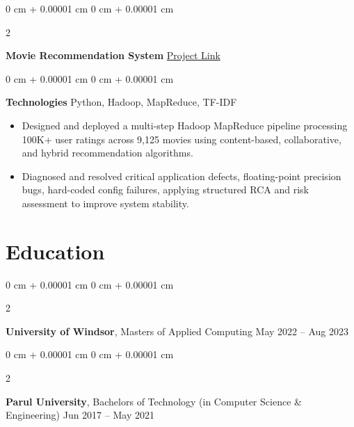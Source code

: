 \documentclass[10pt, letterpaper]{article}
\newenvironment{highlights}{
    \begin{itemize}[
        topsep=0.10 cm,
        parsep=0.10 cm,
        partopsep=0pt,
        itemsep=0pt,
        leftmargin=0 cm + 10pt
    ]
}{
    \end{itemize}
} %
\newenvironment{highlightsforbulletentries}{
    \begin{itemize}[
        topsep=0.10 cm,
        parsep=0.10 cm,
        partopsep=0pt,
        itemsep=0pt,
        leftmargin=10pt
    ]
}{
    \end{itemize}
} %
\newenvironment{onecolentry}{
    \begin{adjustwidth}{
        0 cm + 0.00001 cm
    }{
        0 cm + 0.00001 cm
    }
}{
    \end{adjustwidth}
} %
\newenvironment{twocolentry}[2][]{
    \onecolentry
    \def\secondColumn{#2}
    \setcolumnwidth{\fill, 4.5 cm}
    \begin{paracol}{2}
}{
    \switchcolumn \raggedleft \secondColumn
    \end{paracol}
    \endonecolentry
} %
\begin{document}
        \begin{twocolentry}{
            \href{https://github.com/hpk369/CineMatch}{Project Link}
        }
            \textbf{Movie Recommendation System}\end{twocolentry}
        \vspace{0.10 cm}
        \begin{onecolentry}
            \textbf{Technologies} \> Python, Hadoop, MapReduce, TF-IDF
            \begin{highlights}
                \item Designed and deployed a multi-step Hadoop MapReduce pipeline processing 100K+ user ratings across 9,125 movies using content-based, collaborative, and hybrid recommendation algorithms. 
                \item Diagnosed and resolved critical application defects, floating-point precision bugs, hard-coded config failures, applying structured RCA and risk assessment to improve system stability.
            \end{highlights}
        \end{onecolentry}
    

    \section{Education}
        \begin{twocolentry}{
            May 2022 – Aug 2023
        }
            \textbf{University of Windsor}, Masters of Applied Computing \end{twocolentry}

        \begin{twocolentry}{
            Jun 2017 – May 2021
        }
            \textbf{Parul University}, Bachelors of Technology (in Computer Science \& Engineering)\end{twocolentry}
    
\end{document}
